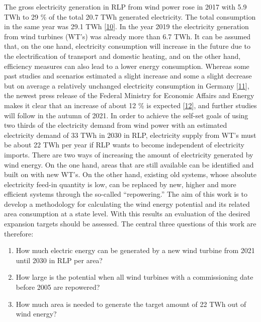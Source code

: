\documentclass[a4paper,11pt]{article}
\begin{document}
The gross electricity generation in RLP from wind power rose in 2017 with 5.9 TWh to 29 \% of the total 20.7 TWh generated electricity. The total consumption in the same year was 29.1 TWh {[}\protect\hyperlink{ref-Lehnert.2020}{10}{]}. In the year 2019 the electricity generation from wind turbines (WT's) was already more than 6.7 TWh. It can be assumed that, on the one hand, electricity consumption will increase in the future due to the electrification of transport and domestic heating, and on the other hand, efficiency measures can also lead to a lower energy consumption. Whereas some past studies and scenarios estimated a slight increase and some a slight decrease but on average a relatively unchanged electricity consumption in Germany {[}\protect\hyperlink{ref-NormanGerhardt.2015}{11}{]}, the newest press release of the Federal Ministry for Economic Affairs and Energy makes it clear that an increase of about 12 \% is expected {[}\protect\hyperlink{ref-AndreasMertens.13.07.2021}{12}{]}, and further studies will follow in the autumn of 2021. In order to achieve the self-set goals of using two thirds of the electricity demand from wind power with an estimated electricity demand of 33 TWh in 2030 in RLP, electricity supply from WT's must be about 22 TWh per year if RLP wants to become independent of electricity imports. There are two ways of increasing the amount of electricity generated by wind energy. On the one hand, areas that are still available can be identified and built on with new WT's. On the other hand, existing old systems, whose absolute electricity feed-in quantity is low, can be replaced by new, higher and more efficient systems through the so-called ``repowering.''
The aim of this work is to develop a methodology for calculating the wind energy potential and its related area consumption at a state level. With this results an evaluation of the desired expansion targets should be assessed. The central three questions of this work are therefore:
\begin{enumerate}
\def\labelenumi{\arabic{enumi}.}
\item
  How much electric energy can be generated by a new wind turbine from 2021 until 2030 in RLP per area?
\item
  How large is the potential when all wind turbines with a commissioning date before 2005 are repowered?
\item
  How much area is needed to generate the target amount of 22 TWh out of wind energy?
\end{enumerate}
\end{document}
